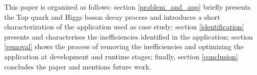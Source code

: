 This paper is organized as follows: section \ref{problem_and_app} briefly presents the Top quark and Higgs boson decay process and introduces a short characterization of the \tth application used as case study; section \ref{identification} presents and characterises the inefficiencies identified in the application; section \ref{removal} shows the process of removing the inefficiencies and optimizing the application at development and runtime stages; finally, section \ref{conclusion} concludes the paper and mentions future work.
